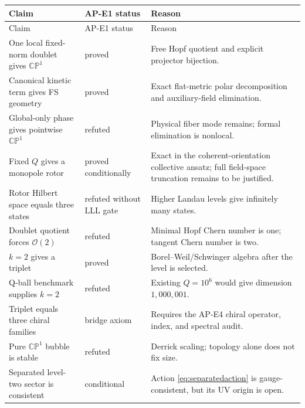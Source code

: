 \documentclass[11pt]{article}
\numberwithin{equation}{section}
\newcommand{\CP}{\mathbb{CP}}
\newcommand{\cO}{\mathcal O}
\newcommand{\status}[1]{\textsf{#1}}
\begin{document}
\begin{longtable}{>{\raggedright\arraybackslash}p{}
                  >{\raggedright\arraybackslash}p{}
                  >{\raggedright\arraybackslash}p{}}
\toprule
Claim & AP-E1 status & Reason \\
\midrule
\endfirsthead
\toprule
Claim & AP-E1 status & Reason \\
\midrule
\endhead
One local fixed-norm doublet gives \(\CP^1\) & \status{proved} & Free Hopf
quotient and explicit projector bijection.\\
Canonical kinetic term gives FS geometry & \status{proved} & Exact flat-metric
polar decomposition and auxiliary-field elimination.\\
Global-only phase gives pointwise \(\CP^1\) & \status{refuted} & Physical
fiber mode remains; formal elimination is nonlocal.\\
Fixed \(Q\) gives a monopole rotor & \status{proved conditionally} & Exact in
the coherent-orientation collective ansatz; full field-space truncation remains
to be justified.\\
Rotor Hilbert space equals three states & \status{refuted without LLL gate} &
Higher Landau levels give infinitely many states.\\
Doublet quotient forces \(\cO(2)\) & \status{refuted} & Minimal Hopf Chern
number is one; tangent Chern number is two.\\
\(k=2\) gives a triplet & \status{proved} & Borel--Weil/Schwinger algebra after
the level is selected.\\
Q-ball benchmark supplies \(k=2\) & \status{refuted} & Existing
\(Q=10^6\) would give dimension \(1{,}000{,}001\).\\
Triplet equals three chiral families & \status{bridge axiom} & Requires the
AP-E4 chiral operator, index, and spectral audit.\\
Pure \(\CP^1\) bubble is stable & \status{refuted} & Derrick scaling; topology
alone does not fix size.\\
Separated level-two sector is consistent & \status{conditional} & Action
\eqref{eq:separatedaction} is gauge-consistent, but its UV origin is open.\\
\bottomrule
\end{longtable}
\end{document}
